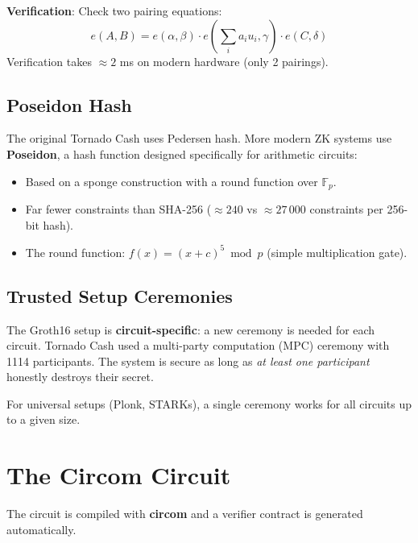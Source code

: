 \documentclass[12pt,a4paper,openany]{book}
\theoremstyle{definition}
\theoremstyle{plain}
\theoremstyle{remark}
\begin{document}
\textbf{Verification}: Check two pairing equations:
\[
  e(A, B) = e(\alpha, \beta)\cdot e(\sum_i a_i u_i, \gamma)
           \cdot e(C, \delta)
\]
Verification takes $\approx 2$ ms on modern hardware (only 2 pairings).

\subsection{Poseidon Hash}

The original Tornado Cash uses Pedersen hash.  More modern ZK systems
use \textbf{Poseidon}, a hash function designed specifically for
arithmetic circuits:
\begin{itemize}
  \item Based on a sponge construction with a round function over
        $\mathbb{F}_p$.
  \item Far fewer constraints than SHA-256 ($\approx 240$ vs $\approx
        27\,000$ constraints per 256-bit hash).
  \item The round function: $f(x) = (x+c)^5\bmod p$ (simple
        multiplication gate).
\end{itemize}

\subsection{Trusted Setup Ceremonies}

The Groth16 setup is \textbf{circuit-specific}: a new ceremony is
needed for each circuit.  Tornado Cash used a multi-party computation
(MPC) ceremony with 1114 participants.  The system is secure as long as
\emph{at least one participant} honestly destroys their secret.

For universal setups (Plonk, STARKs), a single ceremony works for all
circuits up to a given size.

\section{The Circom Circuit}

The circuit is compiled with \textbf{circom} and a verifier contract is
generated automatically.
\end{document}
